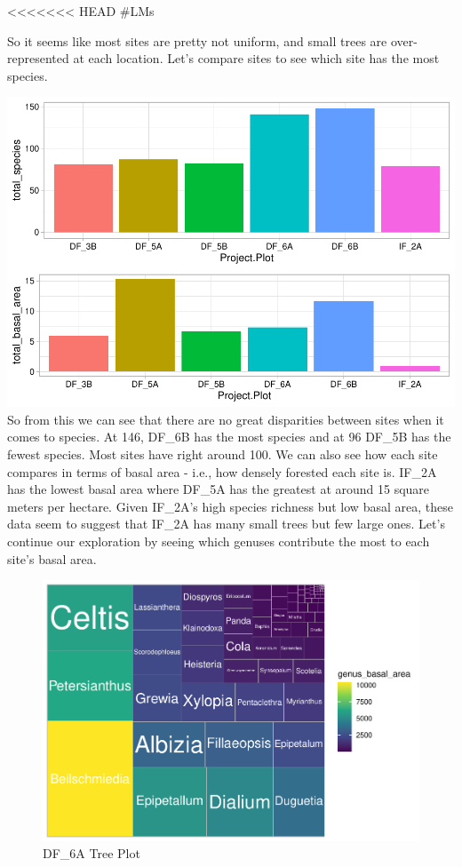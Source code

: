 \documentclass[
  12pt,
]{article}
\begin{document}
\textless\textless\textless\textless\textless\textless\textless{} HEAD
\#LMs

So it seems like most sites are pretty not uniform, and small trees are
over-represented at each location. Let's compare sites to see which site
has the most species.

\includegraphics{GoldenGriffithsKnierMalinowski_ENV872_Project_files/figure-latex/unnamed-chunk-9-1.pdf}
So from this we can see that there are no great disparities between
sites when it comes to species. At 146, DF\_6B has the most species and
at 96 DF\_5B has the fewest species. Most sites have right around 100.
We can also see how each site compares in terms of basal area - i.e.,
how densely forested each site is. IF\_2A has the lowest basal area
where DF\_5A has the greatest at around 15 square meters per hectare.
Given IF\_2A's high species richness but low basal area, these data seem
to suggest that IF\_2A has many small trees but few large ones. Let's
continue our exploration by seeing which genuses contribute the most to
each site's basal area.

\begin{figure}
\centering
\includegraphics{GoldenGriffithsKnierMalinowski_ENV872_Project_files/figure-latex/unnamed-chunk-10-1.pdf}
\caption{DF\_6A Tree Plot}
\end{figure}
\end{document}
